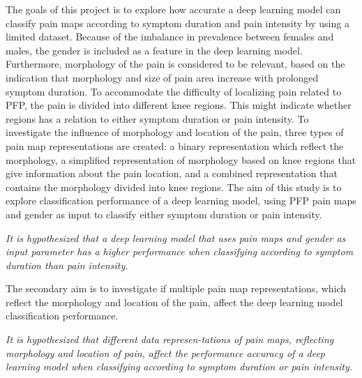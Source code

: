 \noindent
The goals of this project is to explore how accurate a deep learning model can classify pain maps according to symptom duration and pain intensity by using a limited dataset. Because of the imbalance in prevalence between females and males, the gender is included as a feature in the deep learning model. 
Furthermore, morphology of the pain is considered to be relevant, based on the indication that morphology and size of pain area increase with prolonged symptom duration. 
To accommodate the difficulty of localizing pain related to PFP, the pain is divided into different knee regions. This might indicate whether regions has a relation to either symptom duration or pain intensity.
\noindent
To investigate the influence of morphology and location of the pain, three types of pain map representations are created: a binary representation which reflect the morphology, a simplified representation of morphology based on knee regions that give information about the pain location, and a combined representation that contains the morphology divided into knee regions. \newline  
\noindent
The aim of this study is to explore classification performance of a deep learning model, using PFP pain maps and gender as input to classify either symptom duration or pain intensity. 

\begin{center}
\textit{It is hypothesized that a deep learning model that uses pain maps and gender as input parameter has a higher performance when classifying according to symptom duration than pain intensity.}
\end{center}

\noindent
The secondary aim is to investigate if multiple pain map representations, which reflect the morphology and location of the pain, affect the deep learning model classification performance.                                                    
\begin{center}
\textit{It is hypothesized that different data represen-\newline tations of pain maps, reflecting morphology and location of pain, affect the performance
accuracy of a deep learning model when classifying according to symptom duration or pain intensity.
}
\end{center}

